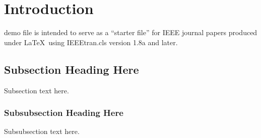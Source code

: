 \section{Introduction}

 demo file is intended to serve as a ``starter file''
for IEEE journal papers produced under \LaTeX\ using
IEEEtran.cls version 1.8a and later.


\subsection{Subsection Heading Here}
Subsection text here.

\subsubsection{Subsubsection Heading Here}
Subsubsection text here.